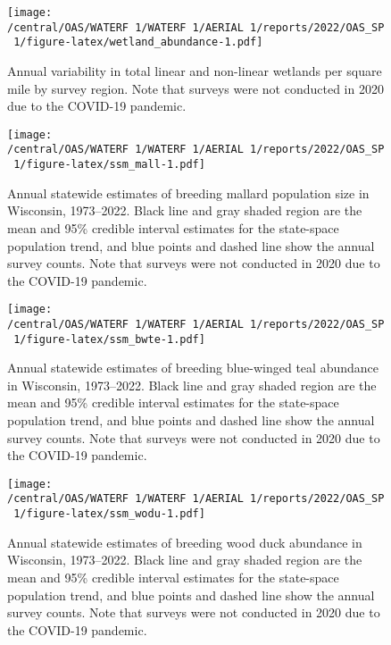 \documentclass[
  12pt,
]{article}
\begin{document}
\newpage

\begin{figure}
\centering
\texttt{[image: /central/OAS/WATERF~1/WATERF~1/AERIAL~1/reports/2022/OAS\_SP~1/figure-latex/wetland\_abundance-1.pdf]}
\caption{\label{fig:wetland_abundance}Annual variability in total linear
and non-linear wetlands per square mile by survey region. Note that
surveys were not conducted in 2020 due to the COVID-19 pandemic.}
\end{figure}

\newpage

\begin{figure}
\centering
\texttt{[image: /central/OAS/WATERF~1/WATERF~1/AERIAL~1/reports/2022/OAS\_SP~1/figure-latex/ssm\_mall-1.pdf]}
\caption{\label{fig:ssm_mall}Annual statewide estimates of breeding
mallard population size in Wisconsin, 1973--2022. Black line and gray
shaded region are the mean and 95\% credible interval estimates for the
state-space population trend, and blue points and dashed line show the
annual survey counts. Note that surveys were not conducted in 2020 due
to the COVID-19 pandemic.}
\end{figure}

\newpage

\begin{figure}
\centering
\texttt{[image: /central/OAS/WATERF~1/WATERF~1/AERIAL~1/reports/2022/OAS\_SP~1/figure-latex/ssm\_bwte-1.pdf]}
\caption{\label{fig:ssm_bwte}Annual statewide estimates of breeding
blue-winged teal abundance in Wisconsin, 1973--2022. Black line and gray
shaded region are the mean and 95\% credible interval estimates for the
state-space population trend, and blue points and dashed line show the
annual survey counts. Note that surveys were not conducted in 2020 due
to the COVID-19 pandemic.}
\end{figure}

\newpage

\begin{figure}
\centering
\texttt{[image: /central/OAS/WATERF~1/WATERF~1/AERIAL~1/reports/2022/OAS\_SP~1/figure-latex/ssm\_wodu-1.pdf]}
\caption{\label{fig:ssm_wodu}Annual statewide estimates of breeding wood
duck abundance in Wisconsin, 1973--2022. Black line and gray shaded
region are the mean and 95\% credible interval estimates for the
state-space population trend, and blue points and dashed line show the
annual survey counts. Note that surveys were not conducted in 2020 due
to the COVID-19 pandemic.}
\end{figure}
\end{document}
